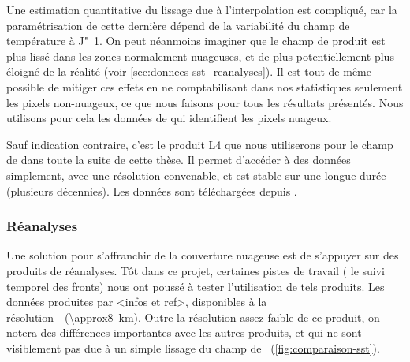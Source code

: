 Une estimation quantitative du lissage due à l'interpolation est compliqué, car la paramétrisation de cette dernière dépend de la variabilité du champ de température à J"~1.
On peut néanmoins imaginer que le champ de  produit est plus lissé dans les zones normalement nuageuses, et de plus potentiellement plus éloigné de la réalité (voir \cref{sec:donnees-sst_reanalyses}).
Il est tout de même possible de mitiger ces effets en ne comptabilisant dans nos statistiques seulement les pixels non-nuageux, ce que nous faisons pour tous les résultats présentés.
Nous utilisons pour cela les données de  qui identifient les pixels nuageux.

Sauf indication contraire, c'est le produit L4 que nous utiliserons pour le champ de  dans toute la suite de cette thèse.
Il permet d'accéder à des données  simplement, avec une résolution convenable, et est stable sur une longue durée (plusieurs décennies).
Les données sont téléchargées depuis .

\subsubsection{Réanalyses}

Une solution pour s'affranchir de la couverture nuageuse est de s'appuyer sur des produits de réanalyses.
Tôt dans ce projet, certaines pistes de travail ( le suivi temporel des fronts) nous ont poussé à tester l'utilisation de tels produits.
Les données produites par <infos et ref>, disponibles à la résolution~~(\qty{\approx8}{\km}).
Outre la résolution assez faible de ce produit, on notera des différences importantes avec les autres produits, et qui ne sont visiblement pas due à un simple lissage du champ de ~(\cref{fig:comparaison-sst}).


